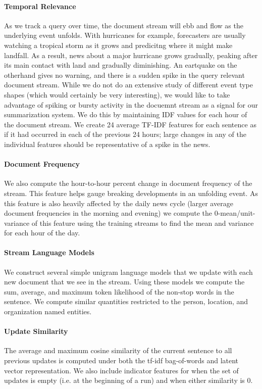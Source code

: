 \paragraph{Temporal Relevance} As we track a query over time, the document
stream will ebb and flow as the underlying event unfolds. With hurricanes
for example, forecasters are usually watching a tropical storm as it grows
and predicitng where it might make landfall. As a result, news about a major
hurricane grows gradually, peaking after its main contact with land
and gradually diminishing. An eartquake on the otherhand gives no warning,
and there is a sudden spike in the query relevant document stream.
While we do not
do an extensive study of different event type shapes (which would certainly 
be very interesting), we would like to take advantage of spiking or bursty
activity in the docuemnt stream as a signal for our summarization system.
We do this by maintaining IDF values for each hour of the document stream.
We create 24 average TF-IDF features for each sentence as if it had occurred
in each of the previous 24 hours; large changes in any of the individual
features should be representative of a spike in the news.

\paragraph{Document Frequency} We also compute the hour-to-hour
percent change in document frequency of the stream. This
feature helps gauge breaking developments in an unfolding
event. As this feature is also heavily affected by the daily
news cycle (larger average document frequencies in the morning
and evening) we compute the 0-mean/unit-variance of this
feature using the training streams to find the mean and variance
for each hour of the day.



\paragraph{Stream Language Models}
We construct several simple unigram language models that we update with 
each new document that we see in the stream. Using these models 
we compute the sum, average, and maximum token likelihood
of the non-stop words
in the sentence. We compute similar quantities restricted to
the person, location, and organization named entities.

\paragraph{Update Similarity} The average and maximum cosine similarity
of the current sentence to all previous updates is computed
under both the tf-idf bag-of-words and latent vector
representation. We also include indicator features for when
the set of updates is empty (i.e. at the beginning of a run) and
when either similarity is 0.


